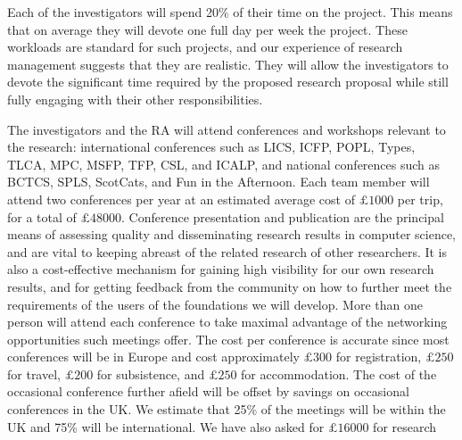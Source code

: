 \documentclass[a4paper,11pt]{article}
\begin{document}
\vspace{0.02in}

Each of the investigators will spend 20\% of their time on the project.
This means that on average they will devote one
full day per week the project. These workloads are standard for such projects, and
our experience of research management suggests that they are
realistic. They will allow the investigators to devote the significant
time required by the proposed research proposal while still fully
engaging with their other responsibilities.

\vspace{0.02in}

 The investigators and the RA will
attend conferences and workshops relevant to the research:
international conferences such as LICS, ICFP, POPL, Types, TLCA, MPC,
MSFP, TFP, CSL, and ICALP, and national conferences such as BCTCS,
SPLS, ScotCats, and Fun in the Afternoon. Each team member will
attend two conferences per year at an estimated average cost of
$\pounds 1000$ per trip, for a total of $\pounds 48000$. Conference
presentation and publication are the principal
means of assessing quality and disseminating
research results in computer science, and are vital to
keeping abreast of the related research of other researchers. It is
also a cost-effective mechanism for gaining high visibility for our
own research results, and for getting feedback from the community on
how to further meet the requirements of the users of the foundations
we will develop.
More than one person
will attend each conference to take maximal advantage of the
networking opportunities such meetings offer. The cost per conference
is accurate since most conferences will be in Europe and cost
approximately $\pounds 300$ for registration, $\pounds 250$ for
travel, $\pounds 200$ for subsistence, and $\pounds 250$ for
accommodation. The cost of the occasional conference further afield
will be offset by savings on occasional conferences in the UK. We
estimate that 25\% of the meetings will be within the UK and 75\% will
be international.  We have also asked for $\pounds 16000$ for research
\end{document}
